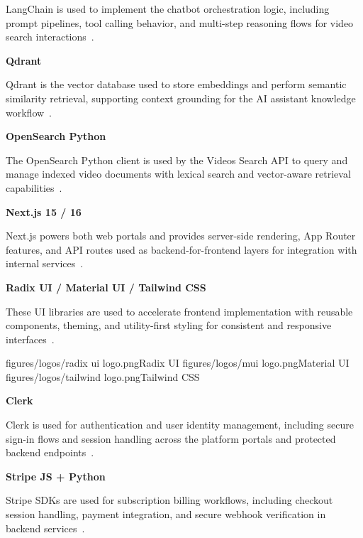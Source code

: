 LangChain is used to implement the chatbot orchestration logic, including prompt pipelines, tool
calling behavior, and multi-step reasoning flows for video search interactions~.


\textbf{Qdrant}

Qdrant is the vector database used to store embeddings and perform semantic similarity retrieval,
supporting context grounding for the AI assistant knowledge workflow~.


\textbf{OpenSearch Python}

The OpenSearch Python client is used by the Videos Search API to query and manage indexed video
documents with lexical search and vector-aware retrieval capabilities~.


\textbf{Next.js 15 / 16}

Next.js powers both web portals and provides server-side rendering, App Router features, and API
routes used as backend-for-frontend layers for integration with internal services~.


\textbf{Radix UI / Material UI / Tailwind CSS}

These UI libraries are used to accelerate frontend implementation with reusable components, theming,
and utility-first styling for consistent and responsive interfaces~.

\toollogotriple
  {figures/logos/radix ui logo.png}{Radix UI}
  {figures/logos/mui logo.png}{Material UI}
  {figures/logos/tailwind logo.png}{Tailwind CSS}

\textbf{Clerk}

Clerk is used for authentication and user identity management, including secure sign-in flows and
session handling across the platform portals and protected backend endpoints~.


\textbf{Stripe JS + Python}

Stripe SDKs are used for subscription billing workflows, including checkout session handling, payment
integration, and secure webhook verification in backend services~.

